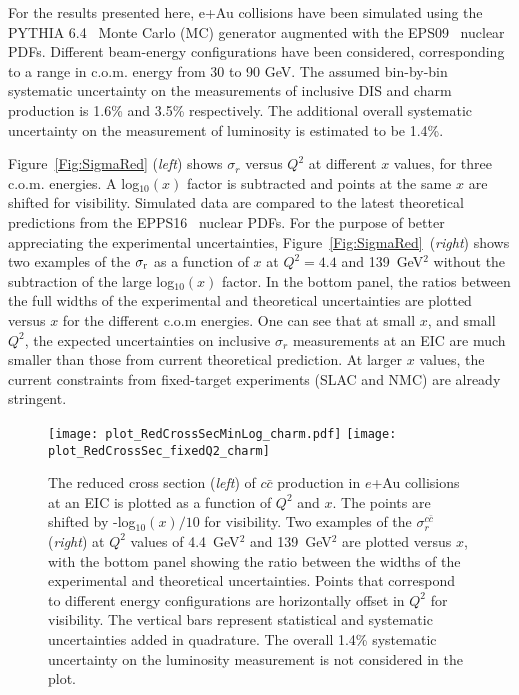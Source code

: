 \documentclass{PoS}
\begin{document}
For the results presented here, e+Au collisions have been simulated using the PYTHIA 6.4~\cite{Pythia64} Monte Carlo (MC) generator augmented with the EPS09~\cite{EPS09} nuclear PDFs. Different beam-energy configurations have been considered, corresponding to a range in c.o.m. energy from 30 to 90 GeV. The assumed bin-by-bin systematic uncertainty on the measurements of inclusive DIS and charm production is 1.6\% and 3.5\% respectively. The additional overall systematic uncertainty on the measurement of luminosity is estimated to be 1.4\%.

Figure~\ref{Fig:SigmaRed} ({\it left}) shows $\sigma_{r}$ versus $Q^2$ at different $x$ values, for three c.o.m. energies. A log$_{10}(x)$ factor is subtracted and points at the same $x$ are shifted for visibility. Simulated data are compared to the latest theoretical predictions from the EPPS16~\cite{EPPS16} nuclear PDFs. 
For the purpose of better appreciating the experimental uncertainties, Figure~\ref{Fig:SigmaRed}~({\it right}) shows two examples of the $\sigma_{\rm r}$ as a function of $x$ at $Q^{2} = 4.4$ and 139~GeV$^{2}$ without the subtraction of the large log$_{10}(x)$ factor. In the bottom panel, the ratios between the full widths of the experimental and theoretical uncertainties are plotted versus $x$ for the different c.o.m energies. One can see that at small $x$, and small $Q^2$, the expected uncertainties on inclusive $\sigma_{r}$ measurements at an EIC are much smaller than those from current theoretical prediction. At larger $x$ values, the current constraints from fixed-target experiments (SLAC and NMC) are already stringent.

\begin{figure}[t] 
   \centering
      \texttt{[image: plot\_RedCrossSecMinLog\_charm.pdf]}   
      \texttt{[image: plot\_RedCrossSec\_fixedQ2\_charm]}
   \caption{The reduced cross section ({\it left}) of $c\bar{c}$ production in $e$+Au collisions at an EIC is 
plotted as a function of $Q^2$ and $x$. The points are shifted by -log$_{10}(x)/10$ for visibility. 
Two examples of the $\sigma_{r}^{c\bar{c}}$ ({\it right}) at $Q^{2}$ values of 4.4~GeV$^{2}$ and 139~GeV$^{2}$ are plotted versus $x$, with the bottom panel showing the ratio between the widths of the experimental and theoretical uncertainties. Points that correspond to different energy configurations are horizontally offset in $Q^2$ for visibility. The vertical bars represent statistical and systematic uncertainties added in quadrature. The overall 1.4\% systematic uncertainty on the luminosity measurement is not considered in the plot.}
\label{Fig:F2c}
\end{figure}
\end{document}
